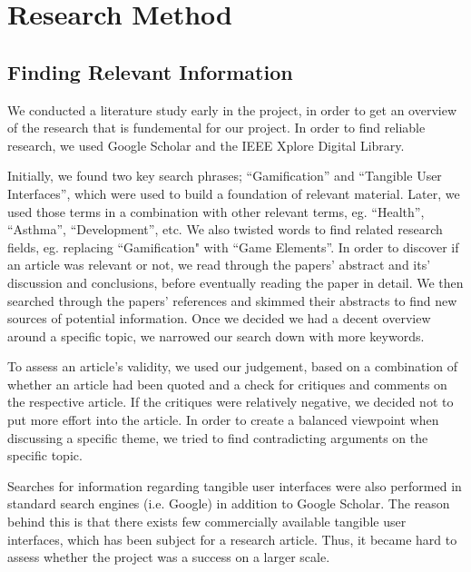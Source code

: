 \chapter{Research Method}
\label{sec:researchmethod}

\section{Finding Relevant Information}
\label{sec:literaturestudy}

We conducted a literature study early in the project, in order to get an overview of the research that is fundemental for our project. In order to find reliable research, we used Google Scholar and the IEEE Xplore Digital Library. 

Initially, we found two key search phrases; ``Gamification'' and ``Tangible User Interfaces'', which were used to build a foundation of relevant material. Later, we used those terms in a combination with other relevant terms, eg. ``Health'', ``Asthma'', ``Development'', etc. We also twisted words to find related research fields, eg. replacing ``Gamification" with ``Game Elements''. 
In order to discover if an article was relevant or not, we read through the papers' abstract and its' discussion and conclusions, before eventually reading the paper in detail. We then searched through the papers' references and skimmed their abstracts to find new sources of potential information. Once we decided we had a decent overview around a specific topic, we narrowed our search down with more keywords.

To assess an article's validity, we used our judgement, based on a combination of whether an article had been quoted and a check for critiques and comments on the respective article. If the critiques were relatively negative, we decided not to put more effort into the article. In order to create a balanced viewpoint when discussing a specific theme, we tried to find contradicting arguments on the specific topic.  

Searches for information regarding tangible user interfaces were also performed in standard search engines (i.e. Google) in addition to Google Scholar. The reason behind this is that there exists few commercially available tangible user interfaces, which has been subject for a research article. Thus, it became hard to assess whether the project was a success on a larger scale. 
 
